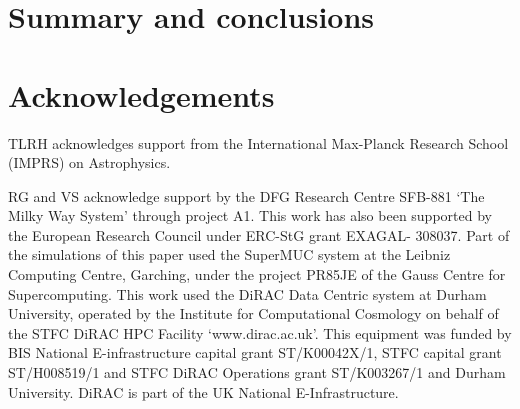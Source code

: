 \documentclass[a4paper,fleqn,usenatbib]{mnras}
\begin{document}


\section{Summary and conclusions}
\label{sec:conclusions}


\section*{Acknowledgements}
TLRH acknowledges support from the International Max-Planck Research School (IMPRS) on Astrophysics.

RG and VS acknowledge support by the DFG Research Centre SFB-881 `The
Milky Way System' through project A1. This work has also been
supported by the European Research Council under ERC-StG grant
EXAGAL- 308037. Part of the simulations of this paper used the
SuperMUC system at the Leibniz Computing Centre, Garching,
under the project PR85JE of the Gauss Centre for Supercomputing.
This work used the DiRAC Data Centric system at Durham
University, operated by the Institute for Computational Cosmology
on behalf of the STFC DiRAC HPC Facility `www.dirac.ac.uk'.
This equipment was funded by BIS National E-infrastructure capital 
grant ST/K00042X/1, STFC capital grant ST/H008519/1 and
STFC DiRAC Operations grant ST/K003267/1 and Durham University. 
DiRAC is part of the UK National E-Infrastructure.







\end{document}
